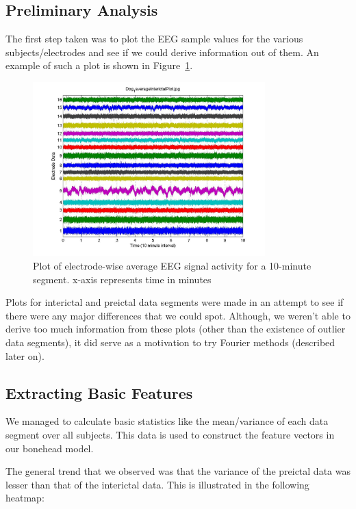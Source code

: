 \documentclass[a4paper]{article}
\begin{document}
\subsection{Preliminary Analysis}
\label{prelim}
The first step taken was to plot the EEG sample values for the various subjects/electrodes and see if we could derive information out of them. An example of such a plot is shown in Figure~\ref{fig:eeg}.

\begin{figure}
  \centering
    \includegraphics[width=0.8\textwidth]{EEGPlot.jpg}
  \caption{Plot of electrode-wise average EEG signal activity for a 10-minute segment. x-axis represents time in minutes}
  \label{fig:eeg}
\end{figure}

Plots for interictal and preictal data segments were made in an attempt to see if there were any major differences that we could spot. Although, we weren't able to derive too much information from these plots (other than the existence of outlier data segments), it did serve as a motivation to try Fourier methods (described later on).

\subsection{Extracting Basic Features}
We managed to calculate basic statistics like the mean/variance of each data segment over all subjects. This data is used to construct the feature vectors in our bonehead model.

The general trend that we observed was that the variance of the preictal data was lesser than that of the interictal data. This is illustrated in the following heatmap:
\end{document}
